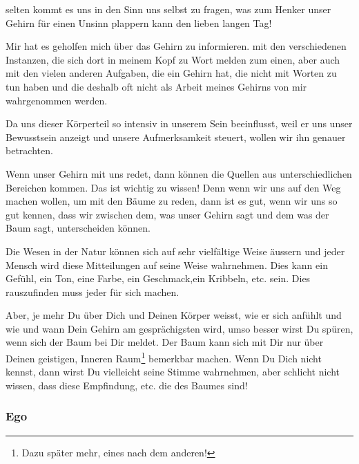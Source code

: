 \documentclass[11pt,titlepage,a5paper]{book}
\begin{document}
selten kommt es uns in den Sinn uns selbst zu fragen, was zum Henker unser Gehirn für einen Unsinn plappern kann den lieben langen Tag!

Mir hat es geholfen mich über das Gehirn zu informieren. mit den verschiedenen Instanzen, die sich dort in meinem Kopf zu Wort melden zum einen, aber auch mit den vielen anderen Aufgaben, die ein Gehirn hat, die nicht mit Worten zu tun haben und die deshalb oft nicht als Arbeit meines Gehirns von mir wahrgenommen werden.

Da uns dieser Körperteil so intensiv in unserem Sein beeinflusst, weil er uns unser Bewusstsein anzeigt und unsere Aufmerksamkeit steuert, wollen wir ihn genauer betrachten.

Wenn unser Gehirn mit uns redet, dann können die Quellen aus unterschiedlichen Bereichen kommen. Das ist wichtig zu wissen! Denn wenn wir uns auf den Weg machen wollen, um  mit den Bäume zu reden, dann ist es gut, wenn wir uns so gut kennen, dass wir zwischen dem, was unser Gehirn sagt und dem was der Baum sagt, unterscheiden können.

Die Wesen in der Natur können sich auf sehr vielfältige Weise äussern und jeder Mensch wird diese Mitteilungen auf seine Weise wahrnehmen. Dies kann ein Gefühl, ein Ton, eine Farbe, ein Geschmack,ein Kribbeln, etc. sein. Dies rauszufinden muss jeder für sich machen.

Aber, je mehr Du über Dich und Deinen Körper weisst, wie er sich anfühlt und wie und wann Dein Gehirn am gesprächigsten wird, umso besser wirst Du spüren, wenn sich der Baum bei Dir meldet. Der Baum kann sich mit Dir nur über Deinen geistigen, Inneren Raum\footnote{Dazu später mehr, eines nach dem anderen!} bemerkbar machen. Wenn Du Dich nicht kennst, dann wirst Du vielleicht seine Stimme wahrnehmen, aber schlicht nicht wissen, dass diese Empfindung, etc. die des Baumes sind!

\subsubsection{Ego}

\tableofcontents


{}

\end{document}
